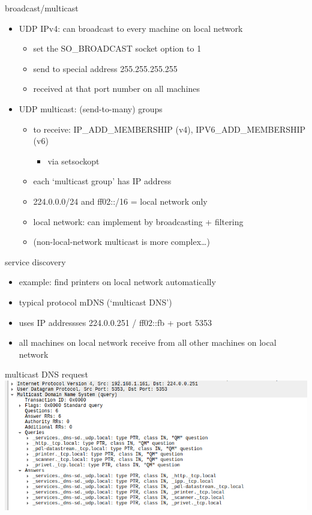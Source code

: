 \begin{frame}{broadcast/multicast}
\begin{itemize}
\item UDP IPv4: can broadcast to every machine on local network
    \begin{itemize}
    \item set the SO\_BROADCAST socket option to 1
    \item send to special address 255.255.255.255 
    \item received at that port number on all machines
    \end{itemize}
\item UDP multicast: (send-to-many) groups
    \begin{itemize}
    \item to receive: IP\_ADD\_MEMBERSHIP (v4), IPV6\_ADD\_MEMBERSHIP (v6)
        \begin{itemize}
        \item via setsockopt
        \end{itemize}
    \item each `multicast group' has IP address
    \item 224.0.0.0/24 and ff02::/16 = local network only
    \item local network: can implement by broadcasting + filtering
    \item (non-local-network multicast is more complex\ldots)
    \end{itemize}
\end{itemize}
\end{frame}

\begin{frame}{service discovery}
\begin{itemize}
\item example: find printers on local network automatically
\vspace{.5cm}
\item typical protocol mDNS (`multicast DNS')
\item uses IP addressses 224.0.0.251 / ff02::fb + port 5353
\item all machines on local network receive from all other machines on local network
\end{itemize}
\end{frame}

\begin{frame}[fragile]{multicast DNS request}
\includegraphics[height=0.85\textheight]{../sockets/mdns-request}
\end{frame}

